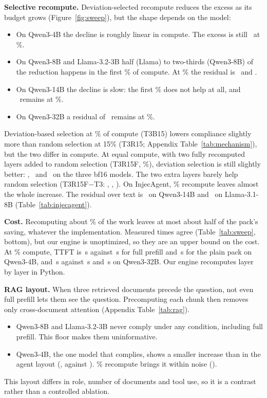 \documentclass[10pt]{article}
\newcommand{\cond}[1]{\textsf{#1}}
\begin{document}
\textbf{Selective recompute.} Deviation-selected recompute reduces the excess as its budget grows (Figure~\ref{fig:sweep}), but the
shape depends on the model:
\begin{itemize}
\item On Qwen3-4B the decline is roughly linear in compute. The excess is still \SweepBfiftyFour\ at \FracBfifty\%.
\item On Qwen3-8B and Llama-3.2-3B half (Llama) to two-thirds (Qwen3-8B) of the reduction happens in the first \FracBfifteen\% of compute. At \FracBfifty\% the
  residual is \SweepBfiftyEight\ and \SweepBfiftyLlama.
\item On Qwen3-14B the decline is slow: the first \FracBfifteen\% does not help at all, and \SweepBfiftyFourteen\ remains at
  \FracBfifty\%.
\item On Qwen3-32B a residual of \SweepBfiftyThirtyTwo\ remains at \FracBfifty\%.
\end{itemize}
Deviation-based selection at \FracBfifteen\% of compute (\cond{T3B15}) lowers compliance slightly more than random selection at 15\%
(\cond{T3R15}; Appendix Table~\ref{tab:mechanism}), but the two differ in compute. At equal compute, with two fully recomputed
layers added to random selection (\cond{T3R15F}, \FracRandomF\%), deviation selection is still slightly better: \InjDevRandFour,
\InjDevRandEight\ and \InjDevRandLlama\ on the three bf16 models. The two extra layers barely help random selection
(\cond{T3R15F}$-$\cond{T3}: \InjRandFFour, \InjRandFEight, \InjRandFLlama). On InjecAgent, \FracBfifteen\%
recompute leaves almost the whole increase. The residual over text is \IaResidFourteen\ on Qwen3-14B and \IaResidLlamaEight\ on
Llama-3.1-8B (Table~\ref{tab:injecagent}).

\textbf{Cost.} Recomputing about \FracBfifty\% of the work leaves at most about half of the pack's saving, whatever the
implementation. Measured times agree (Table~\ref{tab:sweep}, bottom), but our engine is unoptimized, so they are an upper bound on
the cost. At \FracBfifty\% compute, TTFT
is \TtftTthreeBfivezeroFour\,s against \TtftToneFour\,s for full prefill and \TtftTthreeFour\,s for the plain pack on Qwen3-4B, and
\TtftTthreeBfivezeroThirtyTwo\,s against \TtftToneThirtyTwo\,s and \TtftTthreeThirtyTwo\,s on Qwen3-32B. Our engine recomputes layer
by layer in Python.

\textbf{RAG layout.} When three retrieved documents precede the question, not even full prefill lets them see the question.
Precomputing each chunk then removes only cross-document attention (Appendix Table~\ref{tab:rag}).
\begin{itemize}
\item Qwen3-8B and Llama-3.2-3B never comply under any condition, including full prefill. This floor makes them uninformative.
\item Qwen3-4B, the one model that complies, shows a smaller increase than in the agent layout (\RagDFour, against \InjDFour).
  \FracBfifteen\% recompute brings it within noise (\RagDBFour).
\end{itemize}
This layout differs in role, number of documents and tool use, so it is a contrast rather than a controlled ablation.
\end{document}
